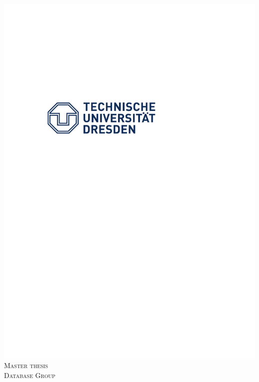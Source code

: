 \documentclass[12pt]{report}
\begin{document}
\linespread{1.6}
\begin{titlepage}

\newcommand{\HRule}{\rule{\linewidth}{0.5mm}} %

\center %
 
\includegraphics{logo_blau}\\[1cm]
\textsc{\Large Master thesis}\\[0.5cm] %
\textsc{\large Database Group}\\[0.5cm] %


\end{titlepage}
\end{document}
